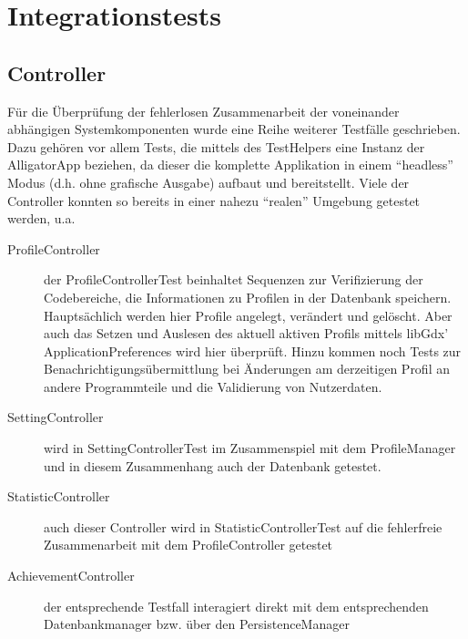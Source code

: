 \chapter{Integrationstests}
\section{Controller}
Für die Überprüfung der fehlerlosen Zusammenarbeit der voneinander abhängigen Systemkomponenten wurde eine Reihe weiterer Testfälle geschrieben.
Dazu gehören vor allem Tests, die mittels des TestHelpers eine Instanz der AlligatorApp beziehen, da dieser die komplette Applikation in einem "`headless"' Modus (d.h. ohne grafische Ausgabe) aufbaut und bereitstellt.
Viele der Controller konnten so bereits in einer nahezu "`realen"' Umgebung getestet werden, u.a.
\begin{description}
	\item[ProfileController] der ProfileControllerTest beinhaltet Sequenzen zur Verifizierung der Codebereiche, die Informationen zu Profilen in der Datenbank speichern.
		Hauptsächlich werden hier Profile angelegt, verändert und gelöscht.
		Aber auch das Setzen und Auslesen des aktuell aktiven Profils mittels libGdx' ApplicationPreferences wird hier überprüft.
		Hinzu kommen noch Tests zur Benachrichtigungsübermittlung bei Änderungen am derzeitigen Profil an andere Programmteile und die Validierung von Nutzerdaten.
	\item[SettingController] wird in SettingControllerTest im Zusammenspiel mit dem ProfileManager und in diesem Zusammenhang auch der Datenbank getestet.
	\item[StatisticController] auch dieser Controller wird in StatisticControllerTest auf die fehlerfreie Zusammenarbeit mit dem ProfileController getestet
	\item[AchievementController] der entsprechende Testfall interagiert direkt mit dem entsprechenden Datenbankmanager bzw. über den PersistenceManager
\end{description}



